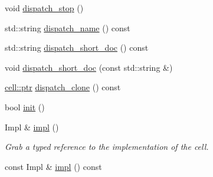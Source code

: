 \begin{DoxyCompactItemize}
\item 
void \hyperlink{structecto_1_1cell___a0951afcee7f4aa52f957f1a6ecc2bfb7}{dispatch\-\_\-stop} ()
\item 
std\-::string \hyperlink{structecto_1_1cell___a288dac8bba40036b3f3e6b0641833039}{dispatch\-\_\-name} () const 
\item 
std\-::string \hyperlink{structecto_1_1cell___aea843d10de8a002ada9a29bec2ecb815}{dispatch\-\_\-short\-\_\-doc} () const 
\item 
void \hyperlink{structecto_1_1cell___a8d9ca18e234396fcdc1875507d3e11a8}{dispatch\-\_\-short\-\_\-doc} (const std\-::string \&)
\item 
\hyperlink{structecto_1_1cell_af2cab9d2bc012088c4f58c40da57a862}{cell\-::ptr} \hyperlink{structecto_1_1cell___ae2868bb59ddb378cbe7b98fd4e776930}{dispatch\-\_\-clone} () const 
\item 
bool \hyperlink{structecto_1_1cell___a06749143e390dcc5fd90f5076620108c}{init} ()
\item 
Impl \& \hyperlink{structecto_1_1cell___a625990e6ac4da1df9be69681881d3e28}{impl} ()
\begin{DoxyCompactList}\small\item\em Grab a typed reference to the implementation of the cell. \end{DoxyCompactList}\item 
const Impl \& \hyperlink{structecto_1_1cell___a05fe9ed5d606a54f761c104f45994a5e}{impl} () const 
\end{DoxyCompactItemize}

